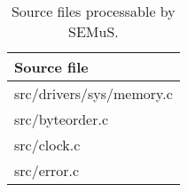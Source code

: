 
\begin{table}[tb]
\scriptsize
\centering
\caption{Source files processable by SEMuS.}
\label{table:processable}
\begin{tabular}{l}
\hline
\textbf{Source file}\\
\hline
src/drivers/sys/memory.c\\
src/byteorder.c\\
src/clock.c\\
src/error.c\\
\hline
\end{tabular}
\end{table}